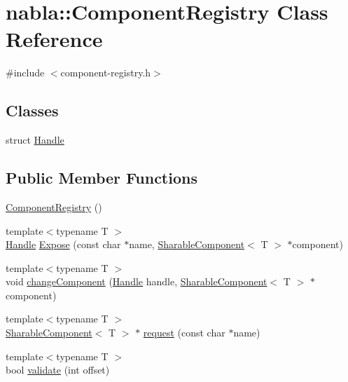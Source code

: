 \hypertarget{classnabla_1_1_component_registry}{}\section{nabla\+::Component\+Registry Class Reference}
\label{classnabla_1_1_component_registry}


{\ttfamily \#include $<$component-\/registry.\+h$>$}

\subsection*{Classes}
\begin{DoxyCompactItemize}
\item 
struct \mbox{\hyperlink{structnabla_1_1_component_registry_1_1_handle}{Handle}}
\end{DoxyCompactItemize}
\subsection*{Public Member Functions}
\begin{DoxyCompactItemize}
\item 
\mbox{\hyperlink{classnabla_1_1_component_registry_a41e06a6e157b4458ad1353070f916e4a}{Component\+Registry}} ()
\item 
{\footnotesize template$<$typename T $>$ }\\\mbox{\hyperlink{structnabla_1_1_component_registry_1_1_handle}{Handle}} \mbox{\hyperlink{classnabla_1_1_component_registry_a776156940c82f102cbcfc7e0fbd2030b}{Expose}} (const char $\ast$name, \mbox{\hyperlink{structnabla_1_1_sharable_component}{Sharable\+Component}}$<$ T $>$ $\ast$component)
\item 
{\footnotesize template$<$typename T $>$ }\\void \mbox{\hyperlink{classnabla_1_1_component_registry_ac6ea0dbc1f8d059e5344a23507a5ad6f}{change\+Component}} (\mbox{\hyperlink{structnabla_1_1_component_registry_1_1_handle}{Handle}} handle, \mbox{\hyperlink{structnabla_1_1_sharable_component}{Sharable\+Component}}$<$ T $>$ $\ast$component)
\item 
{\footnotesize template$<$typename T $>$ }\\\mbox{\hyperlink{structnabla_1_1_sharable_component}{Sharable\+Component}}$<$ T $>$ $\ast$ \mbox{\hyperlink{classnabla_1_1_component_registry_aa61c3930a419c090e7ed649dd87af063}{request}} (const char $\ast$name)
\item 
{\footnotesize template$<$typename T $>$ }\\bool \mbox{\hyperlink{classnabla_1_1_component_registry_a192ab752b97fe4b9be910645b2167a3e}{validate}} (int offset)
\end{DoxyCompactItemize}
